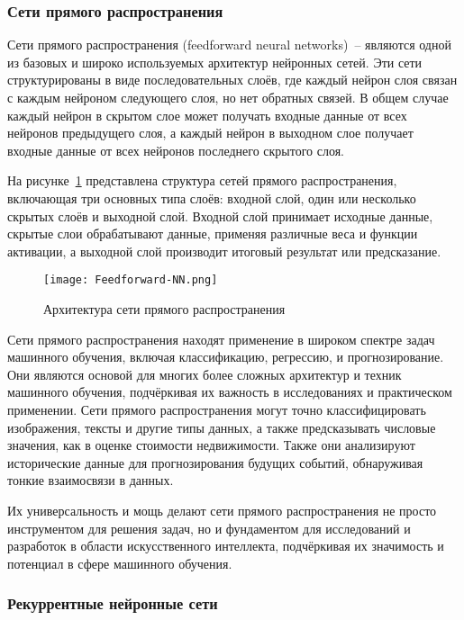 \subsubsection{Сети прямого распространения}

Сети прямого распространения (feedforward neural networks)~-- являются одной из базовых и широко используемых архитектур нейронных сетей. Эти сети структурированы в виде последовательных слоёв, где каждый нейрон слоя связан с каждым нейроном следующего слоя, но нет обратных связей. В общем случае каждый нейрон в скрытом слое 
может получать входные данные от всех нейронов предыдущего слоя, а каждый нейрон в выходном слое получает входные данные от всех нейронов последнего скрытого слоя.

На рисунке~\ref{domain::feedforward-nn} представлена структура сетей прямого распространения, включающая три основных типа слоёв: входной слой, один или несколько скрытых слоёв и выходной слой. Входной слой принимает исходные данные, скрытые слои обрабатывают данные, применяя различные веса и функции активации, а выходной слой производит итоговый результат или предсказание.

\begin{figure}[ht]
    \centering
    \texttt{[image: Feedforward-NN.png]}
    \caption{Архитектура сети прямого распространения}
    \label{domain::feedforward-nn}
\end{figure}

Сети прямого распространения находят применение в широком спектре задач машинного обучения, включая классификацию, регрессию, и прогнозирование. Они являются основой для многих более сложных архитектур и техник машинного обучения, подчёркивая их важность в исследованиях и практическом применении. Сети прямого распространения могут точно классифицировать изображения, тексты и другие типы данных, а также предсказывать числовые значения, как в оценке стоимости недвижимости. Также они анализируют исторические данные для прогнозирования будущих событий, обнаруживая тонкие взаимосвязи в данных.

Их универсальность и мощь делают сети прямого распространения не просто инструментом для решения задач, но и фундаментом для исследований и разработок в области искусственного интеллекта, подчёркивая их значимость и потенциал в сфере машинного обучения.

\subsubsection{Рекуррентные нейронные сети}

